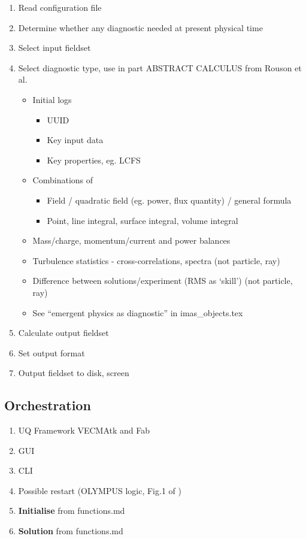 \begin{enumerate}
\def\labelenumi{\arabic{enumi}.}
\item
  Read configuration file
\item
  Determine whether any diagnostic needed at present physical time
\item
  Select input fieldset
\item
  Select diagnostic type, use in part ABSTRACT CALCULUS from Rouson et
  al. \cite{rousonxiaxu}

  \begin{itemize}
  \item
    Initial logs

    \begin{itemize}
    \item
      UUID
    \item
      Key input data
    \item
      Key properties, eg. LCFS
    \end{itemize}
  \item
    Combinations of

    \begin{itemize}
    \item
      Field / quadratic field (eg. power, flux quantity) / general
      formula
    \item
      Point, line integral, surface integral, volume integral
    \end{itemize}
  \item
    Mass/charge, momentum/current and power balances
  \item
    Turbulence statistics - cross-correlations, spectra (not particle,
    ray)
  \item
    Difference between solutions/experiment (RMS as `skill') (not
    particle, ray)
  \item
    See ``emergent physics as diagnostic'' in imas\_objects.tex
  \end{itemize}
\item
  Calculate output fieldset
\item
  Set output format
\item
  Output fieldset to disk, screen
\end{enumerate}

\subsection{Orchestration}\label{sec:orchestration}

\begin{enumerate}
\def\labelenumi{\arabic{enumi}.}
\item
  UQ Framework VECMAtk and Fab\nep
\item
  GUI
\item
  CLI
\item
  Possible restart (OLYMPUS logic, Fig.1 of \cite{y2re312})
\item
  \textbf{Initialise} from functions.md
\item
  \textbf{Solution} from functions.md
\end{enumerate}
